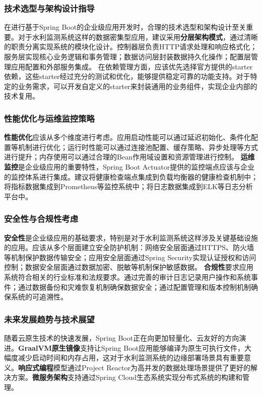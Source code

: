 \subsubsection{技术选型与架构设计指导}\label{ux6280ux672fux9009ux578bux4e0eux67b6ux6784ux8bbeux8ba1ux6307ux5bfc} 在进行基于Spring
Boot的企业级应用开发时，合理的技术选型和架构设计至关重要。对于水利监测系统这样的数据密集型应用，建议采用\textbf{分层架构模式}，通过清晰的职责分离实现系统的模块化设计。控制器层负责HTTP请求处理和响应格式化；服务层实现核心业务逻辑和事务管理；数据访问层封装数据持久化操作；配置层管理应用配置和外部服务集成。
在依赖管理方面，应该优先选择官方提供的starter依赖，这些starter经过充分的测试和优化，能够提供稳定可靠的功能支持。对于特定的业务需求，可以开发自定义的starter来封装通用的业务组件，实现企业内部的技术复用。
\subsubsection{性能优化与运维监控策略}\label{ux6027ux80fdux4f18ux5316ux4e0eux8fd0ux7ef4ux76d1ux63a7ux7b56ux7565}
\textbf{性能优化}应该从多个维度进行考虑。应用启动性能可以通过延迟初始化、条件化配置等机制进行优化；运行时性能可以通过连接池配置、缓存策略、异步处理等方式进行提升；内存使用可以通过合理的Bean作用域设置和资源管理进行控制。
\textbf{运维监控}是企业级应用的重要特性，Spring Boot
Actuator提供的监控端点应该与企业的监控体系进行集成。建议将健康检查端点集成到负载均衡器的健康检查机制中；将指标数据集成到Prometheus等监控系统中；将日志数据集成到ELK等日志分析平台中。
\subsubsection{安全性与合规性考虑}\label{ux5b89ux5168ux6027ux4e0eux5408ux89c4ux6027ux8003ux8651}
\textbf{安全性}是企业级应用的基础要求，特别是对于水利监测系统这样涉及关键基础设施的应用。应该从多个层面建立安全防护机制：网络安全层面通过HTTPS、防火墙等机制保护数据传输安全；应用安全层面通过Spring
Security实现认证授权和访问控制；数据安全层面通过数据加密、脱敏等机制保护敏感数据。
\textbf{合规性}要求应用系统符合相关的行业标准和法规要求。通过完善的审计日志记录用户操作和系统事件；通过数据备份和灾难恢复机制确保数据安全；通过配置管理和版本控制机制确保系统的可追溯性。
\subsubsection{未来发展趋势与技术展望}\label{ux672aux6765ux53d1ux5c55ux8d8bux52bfux4e0eux6280ux672fux5c55ux671b}
随着云原生技术的快速发展，Spring Boot正在向更加轻量化、云友好的方向演进。\textbf{GraalVM原生镜像}支持让Spring
Boot应用能够编译为原生可执行文件，大幅度减少启动时间和内存占用，这对于水利监测系统的边缘部署场景具有重要意义。\textbf{响应式编程}模型通过Project
Reactor为高并发的数据处理场景提供了更好的解决方案。\textbf{微服务架构}支持通过Spring Cloud生态系统实现分布式系统的构建和管理。
